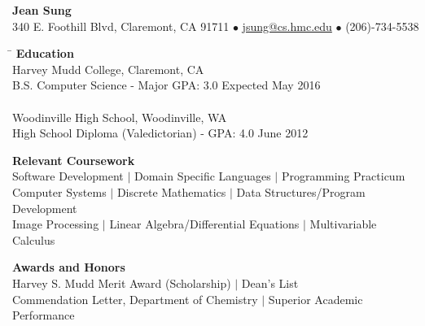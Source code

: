 \documentclass[12pt]{article}
\makeatletter
\newcommand{\selfName}{\huge\textbf{Jean Sung}}
\newcommand{\addrA}{\normalsize 340 E. Foothill Blvd, }
\newcommand{\addrB}{\normalsize Claremont, CA 91711}
\newcommand{\email}{\url{jsung@cs.hmc.edu}}
\newcommand{\phone}{(206)-734-5538 }
\newcommand{\headerdot}{  $\bullet$  }
\newcommand{\vb}{ $\mid$ }
\newcommand{\sectionNL}{\\[2pt]}
\makeatother
\begin{document}

\begin{center}
\selfName \\
\addrA \addrB \headerdot \email \headerdot \phone
\end{center}



\begin{tabbing}
\hspace*{6.5in}\= \kill
{\textbf{Education} } \> \sectionNL
Harvey Mudd College, Claremont, CA \> \\
B.S. Computer Science - Major GPA: 3.0  \hspace{200pt} Expected May 2016 \> \\ \\


Woodinville High School, Woodinville, WA \> \\
High School Diploma (Valedictorian) - GPA: 4.0 \> June 2012
\end{tabbing}


\begin{flushleft}
{\textbf{Relevant Coursework}} \sectionNL
Software Development \vb Domain Specific Languages \vb Programming Practicum \\
Computer Systems \vb Discrete Mathematics \vb Data Structures/Program Development \\
Image Processing \vb Linear Algebra/Differential Equations \vb Multivariable Calculus \\

\end{flushleft}

\begin{flushleft}
{\textbf{Awards and Honors}} \sectionNL
Harvey S. Mudd Merit Award (Scholarship) \vb Dean's List \\
Commendation Letter, Department of Chemistry \vb Superior Academic Performance
\end{flushleft} 
\end{document}
